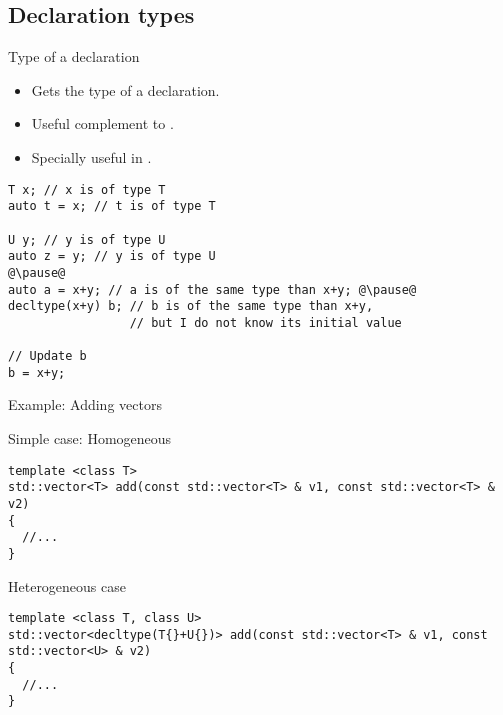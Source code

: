 \subsection{Declaration types}

\begin{frame}[t,fragile]{Type of a declaration}
  \begin{itemize}
    \item Gets the type of a declaration.
    \item Useful complement to .
    \item Specially useful in .
  \end{itemize}

\begin{lstlisting}[escapechar=@]
T x; // x is of type T
auto t = x; // t is of type T

U y; // y is of type U
auto z = y; // y is of type U
@\pause@
auto a = x+y; // a is of the same type than x+y; @\pause@
decltype(x+y) b; // b is of the same type than x+y, 
                 // but I do not know its initial value

// Update b
b = x+y;
\end{lstlisting}
\end{frame}

\begin{frame}[t,fragile]{Example: Adding vectors}
\begin{block}{Simple case: Homogeneous}
\begin{lstlisting}
template <class T>
std::vector<T> add(const std::vector<T> & v1, const std::vector<T> & v2) 
{
  //...
}
\end{lstlisting}
\end{block}

\begin{block}{Heterogeneous case}
\begin{lstlisting}
template <class T, class U>
std::vector<decltype(T{}+U{})> add(const std::vector<T> & v1, const std::vector<U> & v2) 
{
  //...
}
\end{lstlisting}
\end{block}
\end{frame}

